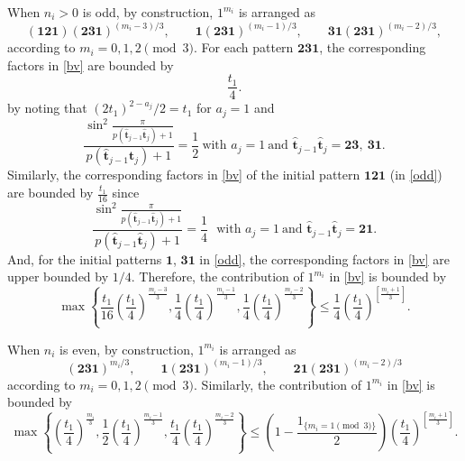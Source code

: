 \documentclass[reqno,11pt,graphicx,]{amsart}
\numberwithin{equation}{section}
\theoremstyle{plain}
\newcommand{\3}{\mathbf{3}}
\begin{document}
	When $n_i>0$ is odd, by construction, $1^{m_i}$ is arranged as
	\begin{equation}
		(\mathbf{121})(\mathbf{231})^{(m_i-3)/3},\qquad
		\mathbf{1}(\mathbf{231})^{(m_i-1)/3},\qquad
		\mathbf{31}(\mathbf{231})^{(m_i-2)/3}, \label{odd}
	\end{equation}
	according to $m_i= 0,1,2\pmod 3$. For each pattern $\mathbf{231}$, the
	corresponding factors in \eqref{bv} are bounded by
	\[
	\frac{t_1}{4}.
	\]
	by noting that $(2t_1)^{2-a_j}/2=t_1$ for $a_{j}=1$ and 
	\begin{equation*}
		\frac{\sin^2\frac{\pi}{p(\hat{\mathbf{t}}_{j-1} \hat{\mathbf{t}}_j)+1}}
		{p(\hat{\mathbf{t}}_{j-1} \hat{\mathbf{t}}_j)+1}=\frac{1}{2} \ \text{with } a_{j}=1 \ \text{and }\hat{\mathbf{t}}_{j-1} \hat{\mathbf{t}}_j=\mathbf{23},\ \mathbf{31}.
	\end{equation*}
	Similarly, the corresponding factors in \eqref{bv} of the initial pattern $\mathbf{121}$ (in \eqref{odd}) are bounded by $\frac{t_1}{16}$ since
	\begin{equation*}
		\frac{\sin^2\frac{\pi}{p(\hat{\mathbf{t}}_{j-1} \hat{\mathbf{t}}_j)+1}}
		{p(\hat{\mathbf{t}}_{j-1} \hat{\mathbf{t}}_j)+1}=\frac{1}{4} \ \ \  \text{with } a_{j}=1 \ \text{and }\hat{\mathbf{t}}_{j-1} \hat{\mathbf{t}}_j=\mathbf{21}.
	\end{equation*}
	And, for the initial patterns $\mathbf{1}$, $\mathbf{31}$ in \eqref{odd}, the corresponding factors in \eqref{bv} are upper bounded by $1/4$.
	Therefore, the contribution of $1^{m_i}$ in \eqref{bv} is bounded by
	\begin{equation}
		\max\left\{\frac{t_1}{16}\left(\frac{t_1}{4}\right)^{\frac{m_i-3}{3}},
		\frac{1}{4}\left(\frac{t_1}{4}\right)^{\frac{m_i-1}{3}},
		\frac{1}{4}\left(\frac{t_1}{4}\right)^{\frac{m_i-2}{3}}\right\}
		\leq\frac{1}{4}\left(\frac{t_1}{4}\right)^{\left[\frac{m_i+1}{3}\right]} . \label{es4}
	\end{equation}
	
	When $n_i$ is even, by construction, $1^{m_i}$ is arranged as
	\begin{equation*}
		(\mathbf{231})^{m_i/3},\qquad
		\mathbf{1}(\mathbf{231})^{(m_i-1)/3},\qquad
		\mathbf{21}(\mathbf{231})^{(m_i-2)/3}
	\end{equation*}
	according to $m_i=0,1,2\pmod3$.	Similarly, the contribution of $1^{m_i}$ in \eqref{bv} is bounded by
	\begin{equation}
		\max\left\{\left(\frac{t_1}{4}\right)^{\frac{m_i}{3}},
		\frac{1}{2}\left(\frac{t_1}{4}\right)^{\frac{m_i-1}{3}},
		\frac{t_1}{4}\left(\frac{t_1}{4}\right)^{\frac{m_i-2}{3}}\right\}
		\leq\left(1-\frac{1_{\{m_i=1\pmod3\}}}{2}\right)
		\left(\frac{t_1}{4}\right)^{\left[\frac{m_i+1}{3}\right]} . \label{es5}
	\end{equation}
	
\end{document}
